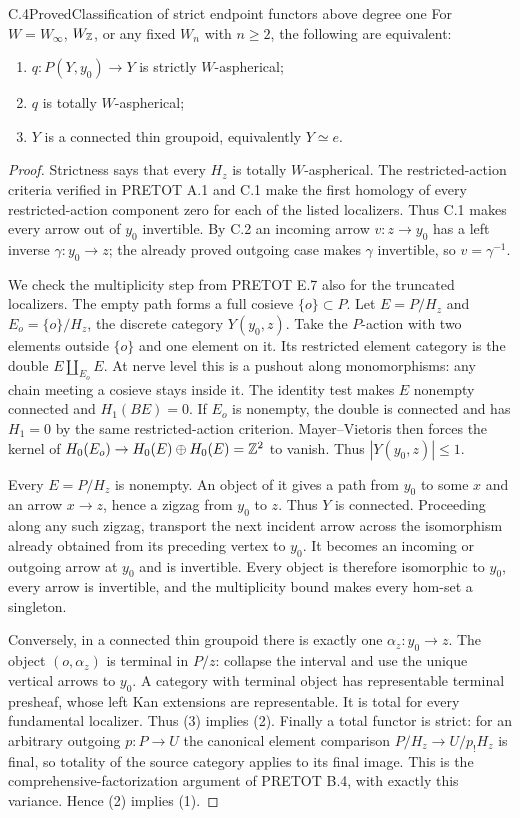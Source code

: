 \begin{claim}{C.4}{Proved}{Classification of strict endpoint functors above degree one}
\label{C:strict-high}
For $W=W_\infty$, $W_{\mathbb Z}$, or any fixed $W_n$ with $n\geq2$,
the following are equivalent:
\begin{enumerate}
\item $q:P(Y,y_0)\to Y$ is strictly $W$-aspherical;
\item $q$ is totally $W$-aspherical;
\item $Y$ is a connected thin groupoid, equivalently $Y\simeq e$.
\end{enumerate}
\end{claim}
\begin{proof}
Strictness says that every $H_z$ is totally $W$-aspherical.
The restricted-action criteria verified in PRETOT A.1 and C.1
make the first homology of every restricted-action component zero
for each of the listed localizers. Thus C.1 makes every arrow
out of $y_0$ invertible. By C.2 an incoming arrow $v:z\to y_0$
has a left inverse $\gamma:y_0\to z$; the already proved outgoing
case makes $\gamma$ invertible, so $v=\gamma^{-1}$.

We check the multiplicity step from PRETOT E.7 also for the truncated
localizers. The empty path forms a full cosieve $\{o\}\subset P$.
Let $E=P/H_z$ and $E_o=\{o\}/H_z$, the discrete category
$Y(y_0,z)$. Take the $P$-action with two elements outside
$\{o\}$ and one element on it. Its restricted element category
is the double $E\amalg_{E_o}E$. At nerve level this is a pushout
along monomorphisms: any chain meeting a cosieve stays inside it.
The identity test makes $E$ nonempty connected and $H_1(BE)=0$.
If $E_o$ is nonempty, the double is connected and has $H_1=0$
by the same restricted-action criterion. Mayer--Vietoris then
forces the kernel of
$H_0(E_o)\to H_0(E)\oplus H_0(E)=\mathbb Z^2$ to vanish.
Thus $|Y(y_0,z)|\leq1$.

Every $E=P/H_z$ is nonempty. An object of it gives a path from
$y_0$ to some $x$ and an arrow $x\to z$, hence a zigzag from
$y_0$ to $z$. Thus $Y$ is connected. Proceeding along any such
zigzag, transport the next incident arrow across the isomorphism
already obtained from its preceding vertex to $y_0$. It becomes
an incoming or outgoing arrow at $y_0$ and is invertible. Every
object is therefore isomorphic to $y_0$, every arrow is invertible,
and the multiplicity bound makes every hom-set a singleton.

Conversely, in a connected thin groupoid there is exactly one
$\alpha_z:y_0\to z$. The object $(o,\alpha_z)$ is terminal
in $P/z$: collapse the interval and use the unique vertical arrows
to $y_0$. A category with terminal object has representable terminal
presheaf, whose left Kan extensions are representable. It is total
for every fundamental localizer. Thus (3) implies (2).
Finally a total functor is strict: for an arbitrary outgoing
$p:P\to U$ the canonical element comparison
$P/H_z\to U/p_!H_z$ is final, so totality of the source category
applies to its final image. This is the comprehensive-factorization
argument of PRETOT B.4, with exactly this variance. Hence (2)
implies (1).
\end{proof}

